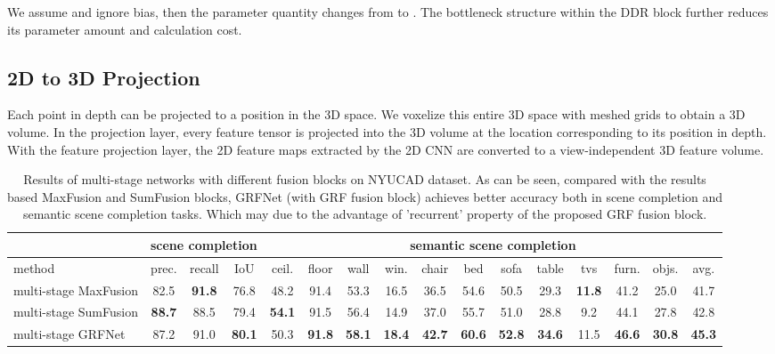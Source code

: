 \documentclass[10pt,twocolumn,letterpaper]{article}
\begin{document}
We assume  and ignore bias, then the parameter quantity changes from  to .
The bottleneck structure within the DDR block further reduces its parameter amount and calculation cost.





\subsection{2D to 3D Projection}
Each point in depth can be projected to a position in the 3D space. We voxelize this entire 3D space with meshed grids to obtain a 3D volume. In the projection layer, every feature tensor is projected into the 3D volume at the location corresponding to its position in depth. With the feature projection layer, the 2D feature maps extracted by the 2D CNN are converted to a view-independent 3D feature volume. 




\begin{table*}[t]
\begin{center}
\scalebox{0.89}
{
\begin{tabular} {l |c c c|c c c c c c c c c c c|c} \hline
 &  \multicolumn{3}{c|}{scene completion} & \multicolumn{12}{c}{semantic scene completion} \\ 
\hline
method  & prec. & recall & IoU & \cellcolor{rgb1}ceil. & \cellcolor{rgb2}floor & \cellcolor{rgb3}wall & \cellcolor{rgb4}win. & \cellcolor{rgb5}chair & \cellcolor{rgb6}bed & \cellcolor{rgb7}sofa & \cellcolor{rgb8}table & \cellcolor{rgb9}tvs & \cellcolor{rgb10}furn. & \cellcolor{rgb11}objs. & avg. \\ 
\hline


\hline
multi-stage MaxFusion  & 82.5 & {\bfseries 91.8} & 76.8  & 48.2  & 91.4 & 53.3 & 16.5 & 36.5 & 54.6 & 50.5 & 29.3 & {\bfseries 11.8} & 41.2 & 25.0 & 41.7 \\
multi-stage SumFusion & {\bfseries 88.7} & 88.5 & 79.4 & {\bfseries 54.1} & 91.5 & 56.4 & 14.9 & 37.0 & 55.7 & 51.0 & 28.8 & 9.2 & 44.1 & 27.8 & 42.8 \\
multi-stage GRFNet   & 87.2 &91.0 & {\bfseries80.1} & 50.3 & {\bfseries91.8} & {\bfseries58.1} & {\bfseries 18.4} &{\bfseries 42.7} & {\bfseries60.6} & {\bfseries52.8} & {\bfseries34.6} & 11.5 & {\bfseries46.6} & {\bfseries30.8} & {\bfseries45.3} \\
\hline
\end{tabular}
}  \vspace{0.2cm}
\caption{Results of multi-stage networks with different fusion blocks on NYUCAD dataset. As can be seen, compared with the results based MaxFusion and SumFusion blocks, GRFNet (with GRF fusion block) achieves better accuracy both in scene completion and semantic scene completion tasks. Which may due to the advantage of 'recurrent' property of the proposed GRF fusion block.}
\label{tab:diff_blocks}
\end{center}
\end{table*}
\end{document}
